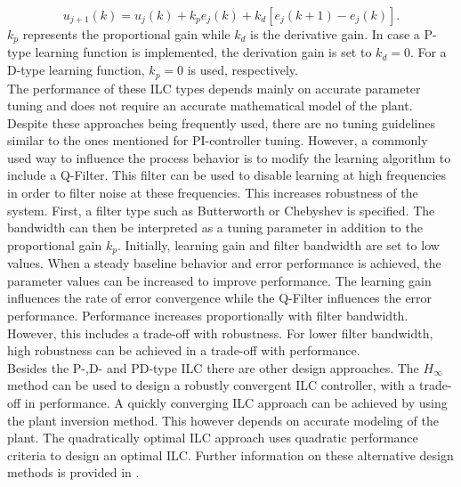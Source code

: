  \begin{equation}
     u_{j+1}(k) = u_{j}(k)+k_{p}e_{j}(k)+k_{d}[e_{j}(k+1)-e_{j}(k)].
  \label{eq:PD_type_2}
  \end{equation}
$k_{p}$ represents the proportional gain while $k_{d}$ is the derivative gain. In case a P-type learning function is implemented, the derivation gain is set to $k_{d}=0$. For a D-type learning function, $k_{p}=0$ is used, respectively.
\\The performance of these ILC types depends mainly on accurate parameter tuning and does not require an accurate mathematical model of the plant. Despite these approaches being frequently used, there are no tuning guidelines similar to the ones mentioned for PI-controller tuning. However, a commonly used way to influence the process behavior is to modify the learning algorithm to include a Q-Filter. This filter can be used to disable learning at high frequencies in order to filter noise at these frequencies. This increases robustness of the system. First, a filter type such as Butterworth or Chebyshev is specified. The bandwidth can then be interpreted as a tuning parameter in addition to the proportional gain $k_{p}$. Initially, learning gain and filter bandwidth are set to low values. When a steady baseline behavior and error performance is achieved, the parameter values can be increased to improve performance. The learning gain influences the rate of error convergence while the Q-Filter influences the error performance. Performance increases proportionally with filter bandwidth. However, this includes a trade-off with robustness. For lower filter bandwidth, high robustness can be achieved in a trade-off with performance.
\\Besides the P-,D- and PD-type ILC there are other design approaches. The $H_{\infty}$ method can be used to design a robustly convergent ILC controller, with a trade-off in performance. A quickly converging ILC approach can be achieved by using the plant inversion method. This however depends on accurate modeling of the plant. The quadratically optimal ILC approach uses quadratic performance criteria to design an optimal ILC. Further information on these alternative design methods is provided in \cite{ILC2}.

